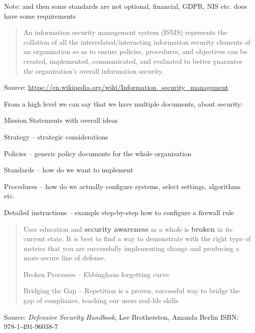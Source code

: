 \documentclass[Screen16to9,17pt]{foils}
\begin{document}
Note: and then some standards are not optional, financial, GDPR, NIS etc. does have some requirements





\begin{quote}\small
An information security management system (ISMS) represents the collation of all the interrelated/interacting information security elements of an organization so as to ensure policies, procedures, and objectives can be created, implemented, communicated, and evaluated to better guarantee the organization's overall information security.
\end{quote}
Source: \url{https://en.wikipedia.org/wiki/Information_security_management}


From a high level we can say that we have multiple documents, about security:
\begin{list2}
\item[] Mission Statements with overall ideas
\item[] Strategy -- strategic considerations
\item[] Policies -- generic policy documents for the whole organisation
\item[] Standards -- how do we want to implement
\item[] Procedures -- how do we actually configure systems, select settings, algorithms etc.
\item[] Detailed instructions -- example step-by-step how to configure a firewall rule
\end{list2}





\begin{quote}
User education and {\bf security awareness} as a whole is {\bf broken} in its current state. It is best to find a way to demonstrate with the right type of metrics that you are successfully implementing change and producing a more secure line of defense.
\begin{list2}
\item Broken Processes -- Ebbinghaus forgetting curve
\item Bridging the Gap -- Repetition is a proven, successful way to bridge the gap of compliance, teaching our users real-life skills
\end{list2}
\end{quote}
Source: \emph{Defensive Security Handbook}, Lee Brotherston, Amanda Berlin ISBN: 978-1-491-96038-7
\end{document}
